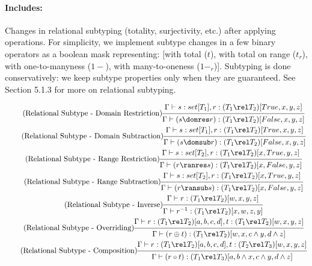 \documentclass{article}
\begin{document}
\paragraph{Includes:} Changes in relational subtyping (totality, surjectivity, etc.) after applying operations.
For simplicity, we implement subtype changes in a few binary operators as a boolean mask representing: [with total ($t$), with total on range ($t_r$), with one-to-manyness ($1-$), with many-to-oneness ($1-_r$)]. Subtyping is done conservatively: we keep subtype properties only when they are guaranteed. See Section 5.1.3 for more on relational subtyping.

\begin{gather}
\tag{Relational Subtype - Domain Restriction}
\begin{prooftree}
\hypo{\Gamma \vdash s: set[T_1], r: (T_1 \rel T_2)[True, x, y, z]}
\infer1{\Gamma \vdash (s \domres r): (T_1 \rel T_2)[False, x, y, z]}
\end{prooftree}
\\
\tag{Relational Subtype - Domain Subtraction}
\begin{prooftree}
\hypo{\Gamma \vdash s: set[T_1], r: (T_1 \rel T_2)[True, x, y, z]}
\infer1{\Gamma \vdash (s \domsub r): (T_1 \rel T_2)[False, x, y, z]}
\end{prooftree}
\\
\tag{Relational Subtype - Range Restriction}
\begin{prooftree}
\hypo{\Gamma \vdash s: set[T_2], r: (T_1 \rel T_2)[x, True, y, z]}
\infer1{\Gamma \vdash (r \ranres s): (T_1 \rel T_2)[x, False, y, z]}
\end{prooftree}
\\
\tag{Relational Subtype - Range Subtraction}
\begin{prooftree}
\hypo{\Gamma \vdash s: set[T_2], r: (T_1 \rel T_2)[x, True, y, z]}
\infer1{\Gamma \vdash (r \ransub s): (T_1 \rel T_2)[x, False, y, z]}
\end{prooftree}
\\
\tag{Relational Subtype - Inverse}
\begin{prooftree}
\hypo{\Gamma \vdash r: (T_1 \rel T_2)[w, x, y, z]}
\infer1{\Gamma \vdash r^{-1}: (T_1 \rel T_2)[x, w, z, y]}
\end{prooftree}
\\
\tag{Relational Subtype - Overriding}
\begin{prooftree}
\hypo{\Gamma \vdash r: (T_1 \rel T_2)[a, b, c, d], t: (T_1 \rel T_2)[w, x, y, z]}
\infer1{\Gamma \vdash (r \oplus t): (T_1 \rel T_2)[w, x, c \land y, d \land z]}
\end{prooftree}
\\
\tag{Relational Subtype - Composition}
\begin{prooftree}
\hypo{\Gamma \vdash r: (T_1 \rel T_2)[a, b, c, d], t: (T_2 \rel T_3)[w, x, y, z]}
\infer1{\Gamma \vdash (r \circ t): (T_1 \rel T_3)[a, b \land x, c \land y, d \land z]}
\end{prooftree}
\end{gather}
\end{document}
